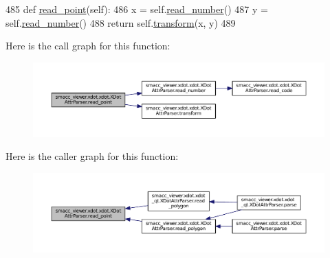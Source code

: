 \begin{DoxyCode}
485     \textcolor{keyword}{def }\hyperlink{classsmacc__viewer_1_1xdot_1_1xdot_1_1XDotAttrParser_a27089e09a2955bbbeb569e0b0fb5255b}{read\_point}(self):
486         x = self.\hyperlink{classsmacc__viewer_1_1xdot_1_1xdot_1_1XDotAttrParser_a3cd5d75659572a2deec8a81b677eb9ab}{read\_number}()
487         y = self.\hyperlink{classsmacc__viewer_1_1xdot_1_1xdot_1_1XDotAttrParser_a3cd5d75659572a2deec8a81b677eb9ab}{read\_number}()
488         \textcolor{keywordflow}{return} self.\hyperlink{classsmacc__viewer_1_1xdot_1_1xdot_1_1XDotAttrParser_ad3be1e9782edc07698a04d232c5fc02b}{transform}(x, y)
489 
\end{DoxyCode}


Here is the call graph for this function\+:
\nopagebreak
\begin{figure}[H]
\begin{center}
\leavevmode
\includegraphics[width=350pt]{classsmacc__viewer_1_1xdot_1_1xdot_1_1XDotAttrParser_a27089e09a2955bbbeb569e0b0fb5255b_cgraph}
\end{center}
\end{figure}




Here is the caller graph for this function\+:
\nopagebreak
\begin{figure}[H]
\begin{center}
\leavevmode
\includegraphics[width=350pt]{classsmacc__viewer_1_1xdot_1_1xdot_1_1XDotAttrParser_a27089e09a2955bbbeb569e0b0fb5255b_icgraph}
\end{center}
\end{figure}


